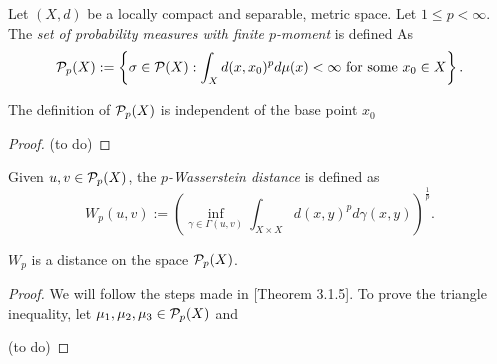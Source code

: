 \begin{example}
    
\end{example}

\begin{definition}
    Let $ (X, d) $ be a locally compact and separable, metric space. Let $ 1 \leq p < \infty $. The {\it set of probability measures with finite $p$-moment} is defined As
    $$
        \mathcal P_p (X) := \left\{ \sigma \in \mathcal P (X) : \int_X d(x, x_0)^p d \mu (x) < \infty \text{ for some } x_0 \in X \right\}.
    $$
\end{definition}

\begin{proposition}
    The definition of $ \mathcal P_p (X) $ is independent of the base point $ x_0 $
\end{proposition}
\begin{proof}
    (to do)
\end{proof}

\begin{definition}
    Given $ u, v \in \mathcal P_p (X) $, the {\it $p$-Wasserstein distance} is defined as
    $$
        W_p(u, v) := \left( \inf_{\gamma \in \Gamma(u, v)} \int_{X \times X} d(x,y)^p d\gamma(x, y)\right)^{\frac{1}{p}}.
    $$
\end{definition}

\begin{proposition}
    $W_p$ is a distance on the space $ \mathcal P_p(X) $.
\end{proposition}

\begin{proof}
    We will follow the steps made in \cite{Figalli}[Theorem 3.1.5].
    To prove the triangle inequality, let $ \mu_1, \mu_2, \mu_3 \in \mathcal P_p(X) $ and 

    (to do)
\end{proof}